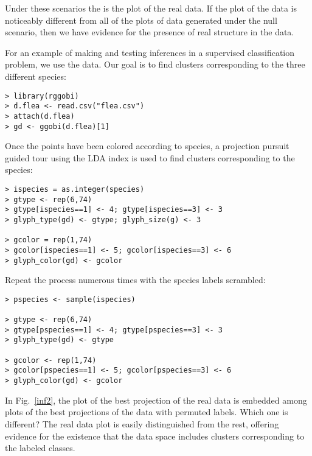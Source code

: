Under these scenarios the   is the plot of the real data. If the plot of
the data is noticeably different from all of the plots of data
generated under the null scenario, then we have evidence for the
presence of real structure in the data.

For an example of making and testing inferences in a supervised
classification problem, we use the 
 data.  Our goal is to find
clusters corresponding to the three different species:

\begin{verbatim}
> library(rggobi)
> d.flea <- read.csv("flea.csv")
> attach(d.flea)
> gd <- ggobi(d.flea)[1]
\end{verbatim}

\noindent Once the points have been colored according to species, a 
projection pursuit guided tour 
using the LDA index  is used
to find clusters corresponding to the species:

\begin{verbatim}
> ispecies = as.integer(species)
> gtype <- rep(6,74)
> gtype[ispecies==1] <- 4; gtype[ispecies==3] <- 3
> glyph_type(gd) <- gtype; glyph_size(g) <- 3

> gcolor = rep(1,74)
> gcolor[ispecies==1] <- 5; gcolor[ispecies==3] <- 6
> glyph_color(gd) <- gcolor
\end{verbatim}

\noindent 
Repeat the process numerous times with the species labels scrambled:

\begin{verbatim}
> pspecies <- sample(ispecies) 

> gtype <- rep(6,74)
> gtype[pspecies==1] <- 4; gtype[pspecies==3] <- 3 
> glyph_type(gd) <- gtype

> gcolor <- rep(1,74) 
> gcolor[pspecies==1] <- 5; gcolor[pspecies==3] <- 6
> glyph_color(gd) <- gcolor
\end{verbatim}

\noindent 
In Fig.~\ref{inf2}, the plot of the best projection of the real data
is embedded among plots of the best projections of the data with
permuted labels. Which one is different? The real data plot is easily
distinguished from the rest, offering evidence for the existence that
the data space includes clusters corresponding to the labeled
classes.

